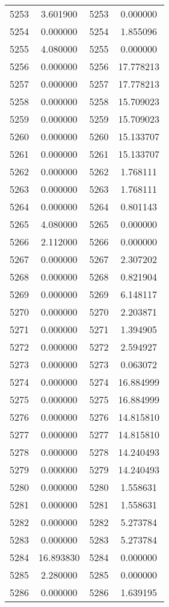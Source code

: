 \documentclass[12pt]{article}
\begin{document}
\begin{longtable}{@{}cccc@{}}
5253 & 3.601900 & 5253 & 0.000000 \\
5254 & 0.000000 & 5254 & 1.855096 \\
5255 & 4.080000 & 5255 & 0.000000 \\
5256 & 0.000000 & 5256 & 17.778213 \\
5257 & 0.000000 & 5257 & 17.778213 \\
5258 & 0.000000 & 5258 & 15.709023 \\
5259 & 0.000000 & 5259 & 15.709023 \\
5260 & 0.000000 & 5260 & 15.133707 \\
5261 & 0.000000 & 5261 & 15.133707 \\
5262 & 0.000000 & 5262 & 1.768111 \\
5263 & 0.000000 & 5263 & 1.768111 \\
5264 & 0.000000 & 5264 & 0.801143 \\
5265 & 4.080000 & 5265 & 0.000000 \\
5266 & 2.112000 & 5266 & 0.000000 \\
5267 & 0.000000 & 5267 & 2.307202 \\
5268 & 0.000000 & 5268 & 0.821904 \\
5269 & 0.000000 & 5269 & 6.148117 \\
5270 & 0.000000 & 5270 & 2.203871 \\
5271 & 0.000000 & 5271 & 1.394905 \\
5272 & 0.000000 & 5272 & 2.594927 \\
5273 & 0.000000 & 5273 & 0.063072 \\
5274 & 0.000000 & 5274 & 16.884999 \\
5275 & 0.000000 & 5275 & 16.884999 \\
5276 & 0.000000 & 5276 & 14.815810 \\
5277 & 0.000000 & 5277 & 14.815810 \\
5278 & 0.000000 & 5278 & 14.240493 \\
5279 & 0.000000 & 5279 & 14.240493 \\
5280 & 0.000000 & 5280 & 1.558631 \\
5281 & 0.000000 & 5281 & 1.558631 \\
5282 & 0.000000 & 5282 & 5.273784 \\
5283 & 0.000000 & 5283 & 5.273784 \\
5284 & 16.893830 & 5284 & 0.000000 \\
5285 & 2.280000 & 5285 & 0.000000 \\
5286 & 0.000000 & 5286 & 1.639195 \\

\end{longtable}
\end{document}
